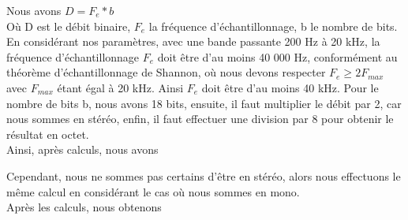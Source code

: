 Nous avons $D = F_e * b$
\\
Où D est le débit binaire, $F_e$ la fréquence d'échantillonnage, b le nombre de bits.
\\
En considérant nos paramètres, avec une bande passante 200 Hz à 20 kHz, la fréquence d'échantillonnage $F_e$ doit être d'au moins 40 000 Hz, conformément au théorème d'échantillonnage de Shannon, où nous devons respecter $F_e\ge 2F_{max}$ avec $F_{max}$ étant égal à 20 kHz. Ainsi $F_e$ doit être d'au moins 40 kHz. Pour le nombre de bits b, nous avons 18 bits, ensuite, il faut multiplier le débit par 2, car nous sommes en stéréo, enfin, il faut effectuer une division par 8 pour obtenir le résultat en octet.
\\
Ainsi, après calculs, nous avons


Cependant, nous ne sommes pas certains d'être en stéréo, alors nous effectuons le même calcul en considérant le cas où nous sommes en mono.
\\
Après les calculs, nous obtenons 